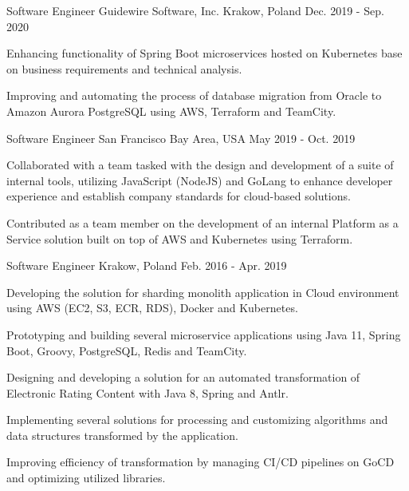 \begin{cventries}
  \cventry
    {Software Engineer} %
    {Guidewire Software, Inc.} %
    {Krakow, Poland} %
    {Dec. 2019 - Sep. 2020} %
    {
      \begin{cvitems} %
       \item {Enhancing functionality of Spring Boot microservices hosted on Kubernetes base on business requirements and technical analysis.}
        \item {Improving and automating the process of database migration from Oracle to Amazon Aurora PostgreSQL using AWS, Terraform and TeamCity.}
      \end{cvitems}
    }

  \cventry
    {Software Engineer} %
    {} %
    {San Francisco Bay Area, USA} %
    {May 2019 - Oct. 2019} %
    {
      \begin{cvitems} %
        \item {Collaborated with a team tasked with the design and development of a suite of internal tools, utilizing JavaScript (NodeJS) and GoLang to enhance developer experience and establish company standards for cloud-based solutions.}
        \item {Contributed as a team member on the development of an internal Platform as a Service solution built on top of AWS and Kubernetes using Terraform. }
      \end{cvitems}
    }

  \cventry
    {Software Engineer} %
    { } %
    {Krakow, Poland} %
    {Feb. 2016 - Apr. 2019} %
    {
      \begin{cvitems} %
        \item {Developing the solution for sharding monolith application in Cloud environment using AWS (EC2, S3, ECR, RDS), Docker and Kubernetes.}
        \item {Prototyping and building several microservice applications using Java 11, Spring Boot, Groovy, PostgreSQL, Redis and TeamCity.}
        \item {Designing and developing a solution for an automated transformation of Electronic Rating Content with Java 8, Spring and Antlr.}
        \item {Implementing several solutions for processing and customizing algorithms and data structures transformed by the application.}
        \item {Improving efficiency of transformation by managing CI/CD pipelines on GoCD and optimizing utilized libraries.}
      \end{cvitems}
    }


\end{cventries}
